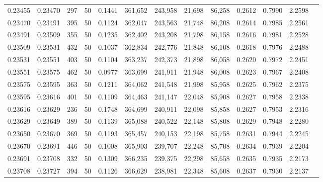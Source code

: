 \begin{tabular}{rrrrrrrrrrrrr}
0.23455 & 0.23470 &   297 &  50 &                                     0.1441 & 361,652 & 243,958 &  21,698 &  86,258 & 0.2612 & 0.7990 & 2.2598 \\
0.23470 & 0.23491 &   395 &  50 &                                     0.1124 & 362,047 & 243,563 &  21,748 &  86,208 & 0.2614 & 0.7985 & 2.2561 \\
0.23491 & 0.23509 &   355 &  50 &                                     0.1235 & 362,402 & 243,208 &  21,798 &  86,158 & 0.2616 & 0.7981 & 2.2528 \\
0.23509 & 0.23531 &   432 &  50 &                                     0.1037 & 362,834 & 242,776 &  21,848 &  86,108 & 0.2618 & 0.7976 & 2.2488 \\
0.23531 & 0.23551 &   403 &  50 &                                     0.1104 & 363,237 & 242,373 &  21,898 &  86,058 & 0.2620 & 0.7972 & 2.2451 \\
0.23551 & 0.23575 &   462 &  50 &                                     0.0977 & 363,699 & 241,911 &  21,948 &  86,008 & 0.2623 & 0.7967 & 2.2408 \\
0.23575 & 0.23595 &   363 &  50 &                                     0.1211 & 364,062 & 241,548 &  21,998 &  85,958 & 0.2625 & 0.7962 & 2.2375 \\
0.23595 & 0.23616 &   401 &  50 &                                     0.1109 & 364,463 & 241,147 &  22,048 &  85,908 & 0.2627 & 0.7958 & 2.2338 \\
0.23616 & 0.23629 &   236 &  50 &                                     0.1748 & 364,699 & 240,911 &  22,098 &  85,858 & 0.2627 & 0.7953 & 2.2316 \\
0.23629 & 0.23649 &   389 &  50 &                                     0.1139 & 365,088 & 240,522 &  22,148 &  85,808 & 0.2629 & 0.7948 & 2.2280 \\
0.23650 & 0.23670 &   369 &  50 &                                     0.1193 & 365,457 & 240,153 &  22,198 &  85,758 & 0.2631 & 0.7944 & 2.2245 \\
0.23670 & 0.23691 &   446 &  50 &                                     0.1008 & 365,903 & 239,707 &  22,248 &  85,708 & 0.2634 & 0.7939 & 2.2204 \\
0.23691 & 0.23708 &   332 &  50 &                                     0.1309 & 366,235 & 239,375 &  22,298 &  85,658 & 0.2635 & 0.7935 & 2.2173 \\
0.23708 & 0.23727 &   394 &  50 &                                     0.1126 & 366,629 & 238,981 &  22,348 &  85,608 & 0.2637 & 0.7930 & 2.2137 \\

\end{tabular}
